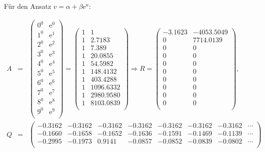 \documentclass[11pt]{article} %
\newcommand{\e}{\mathrm{e}}
\begin{document}
\begin{enumerate}[a)]
Für den Ansatz $v = \alpha + \beta \e^u$:

\begin{eqnarray*}
A &=& \begin{pmatrix}
	0^0 & \e^0 \\
	1^0 & \e^1 \\
	2^0 & \e^2 \\
	3^0 & \e^3 \\
	4^0 & \e^4 \\
	5^0 & \e^5 \\
	6^0 & \e^6 \\
	7^0 & \e^7 \\
	8^0 & \e^8 \\
	9^0 & \e^9 \\
\end{pmatrix} = \begin{pmatrix}
1 &1 \\
1 &2.7183 \\
1 &7.389 \\
1 &20.0855 \\
1 &54.5982 \\
1 &148.4132 \\
1 &403.4288 \\
1 &1096.6332 \\
1 &2980.9580 \\
1 &8103.0839 \\
\end{pmatrix} \Rightarrow R = \begin{pmatrix}
-3.1623	& -4053.5049 \\
0	& 7714.0139 \\
0	& 0 \\
0	& 0 \\
0	& 0 \\
0	& 0 \\
0	& 0 \\
0	& 0 \\
0	& 0 \\
0	& 0 \\
\end{pmatrix}, \\
Q &=& \begin{pmatrix}
   -0.3162 &  -0.3162 &   -0.3162 &   -0.3162 &   -0.3162 &   -0.3162 &   -0.3162 &\cdots \\
   -0.1660 &   -0.1658 &   -0.1652 &   -0.1636 &   -0.1591 &   -0.1469 &   -0.1139 &\cdots \\
   -0.2995 &   -0.1973 &    0.9141 &   -0.0857 &   -0.0852 &   -0.0839 &   -0.0802 &\cdots \\

\end{pmatrix}
\end{eqnarray*}
\end{enumerate}
\end{document}

